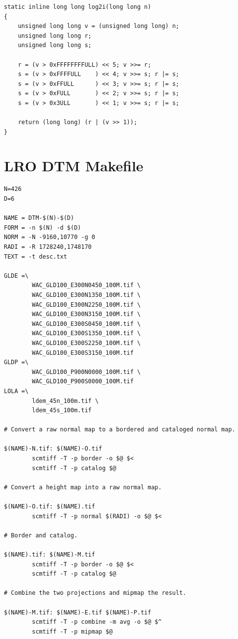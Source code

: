 \documentclass[oneside,10pt]{memoir}
\begin{document}
\begin{Spacing}{1.1}
\begin{Verbatim}
static inline long long log2i(long long n)
{
    unsigned long long v = (unsigned long long) n;
    unsigned long long r;
    unsigned long long s;

    r = (v > 0xFFFFFFFFULL) << 5; v >>= r;
    s = (v > 0xFFFFULL    ) << 4; v >>= s; r |= s;
    s = (v > 0xFFULL      ) << 3; v >>= s; r |= s;
    s = (v > 0xFULL       ) << 2; v >>= s; r |= s;
    s = (v > 0x3ULL       ) << 1; v >>= s; r |= s;

    return (long long) (r | (v >> 1));
}
\end{Verbatim}


\chapter{LRO DTM Makefile}
\label{cha:makefile}

\begin{Verbatim}
N=426
D=6

NAME = DTM-$(N)-$(D)
FORM = -n $(N) -d $(D)
NORM = -N -9160,10770 -g 0
RADI = -R 1728240,1748170
TEXT = -t desc.txt

GLDE =\
        WAC_GLD100_E300N0450_100M.tif \
        WAC_GLD100_E300N1350_100M.tif \
        WAC_GLD100_E300N2250_100M.tif \
        WAC_GLD100_E300N3150_100M.tif \
        WAC_GLD100_E300S0450_100M.tif \
        WAC_GLD100_E300S1350_100M.tif \
        WAC_GLD100_E300S2250_100M.tif \
        WAC_GLD100_E300S3150_100M.tif
GLDP =\
        WAC_GLD100_P900N0000_100M.tif \
        WAC_GLD100_P900S0000_100M.tif
LOLA =\
        ldem_45n_100m.tif \
        ldem_45s_100m.tif

# Convert a raw normal map to a bordered and cataloged normal map.

$(NAME)-N.tif: $(NAME)-O.tif
        scmtiff -T -p border -o $@ $<
        scmtiff -T -p catalog $@

# Convert a height map into a raw normal map.

$(NAME)-O.tif: $(NAME).tif
        scmtiff -T -p normal $(RADI) -o $@ $<

# Border and catalog.

$(NAME).tif: $(NAME)-M.tif
        scmtiff -T -p border -o $@ $<
        scmtiff -T -p catalog $@

# Combine the two projections and mipmap the result.

$(NAME)-M.tif: $(NAME)-E.tif $(NAME)-P.tif
        scmtiff -T -p combine -m avg -o $@ $^
        scmtiff -T -p mipmap $@


\end{Verbatim}
\end{Spacing}
\end{document}
